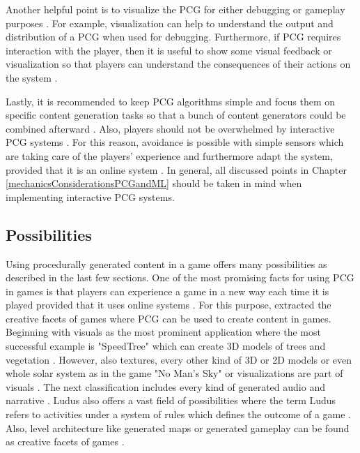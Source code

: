 \documentclass[MGS,Master,english]{twbook}%
\begin{document}
Another helpful point is to visualize the \ac{PCG} for either debugging or gameplay purposes \cite{pcg::book}. For example, visualization can help to understand the output and distribution of a \ac{PCG} when used for debugging. Furthermore, if \ac{PCG} requires interaction with the player, then it is useful to show some visual feedback or visualization so that players can understand the consequences of their actions on the system \cite{pcg::endlessWeb}. 

Lastly, it is recommended to keep \ac{PCG} algorithms simple and focus them on specific content generation tasks so that a bunch of content generators could be combined afterward \cite{pcg::book}.  Also, players should not be overwhelmed by interactive \ac{PCG} systems \cite{pcg::shortHistoryOfDynamicAndPCG}. For this reason, avoidance is possible with simple sensors which are taking care of the players' experience and furthermore adapt the system, provided that it is an online system \cite{pcg::shortHistoryOfDynamicAndPCG}.  In general, all discussed points in Chapter \ref{mechanicsConsiderationsPCGandML} should be taken in mind when implementing interactive \ac{PCG} systems.

\subsection{Possibilities}
Using procedurally generated content in a game offers many possibilities as described in the last few sections. One of the most promising facts for using \ac{PCG} in games is that players can experience a game in a new way each time it is played provided that it uses online systems \cite{pcg::gamasutra::tips}. For this purpose, \citep{pcg::computationalGameCreativity} extracted the creative facets of games where \ac{PCG} can be used to create content in games. Beginning with visuals as the most prominent application where the most successful example is "SpeedTree" \cite{speedTree} which can create \ac{3D} models of trees and vegetation \cite{pcg::computationalGameCreativity}. However, also textures, every other kind of \ac{3D} or \ac{2D} models or even whole solar system as in the game "No Man's Sky" \cite{game::noMansSky} or visualizations are part of visuals \cite{pcg::computationalGameCreativity}. The next classification includes every kind of generated audio and narrative \cite{pcg::computationalGameCreativity}. Ludus also offers a vast field of possibilities where the term Ludus refers to activities under a system of rules which defines the outcome of a game \cite{pcg::computationalGameCreativity}. Also, level architecture like generated maps or generated gameplay can be found as creative facets of games \cite{pcg::computationalGameCreativity}.
\end{document}

